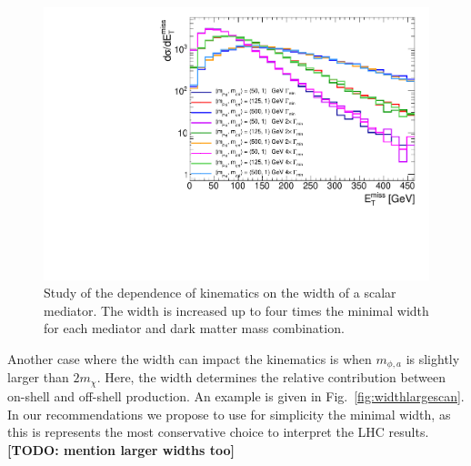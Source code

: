 \begin{figure}[!ht]
  \begin{center}
    \includegraphics[scale=0.45]{figures/ttbar/MEt_smallwidth.pdf}
    \vspace{2mm}
    \caption{\label{fig:widthsmallscan} Study of the dependence of kinematics on the width of a scalar mediator. The width is increased up to four times the minimal width for each mediator and dark matter mass combination. 
    }
\end{center}
\end{figure}

Another case where the width can impact the kinematics is when $m_{\phi,a}$ is slightly larger than $2m_\chi$. Here, the width determines the relative contribution between on-shell and off-shell production. An example is given in Fig.~\ref{fig:widthlargescan}. In our recommendations we propose to use for simplicity the minimal width, as this is represents the most conservative choice to interpret the LHC results. \textbf{[TODO: mention larger widths too]}

